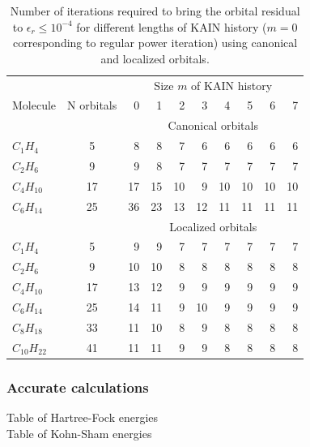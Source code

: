 \documentclass[mathserif]{beamer}
\begin{document}
\begin{frame}
\begin{table}
\scriptsize
\centering
\caption{\scriptsize{Number of iterations required to bring the orbital residual to 
	$\epsilon_r\leq10^{-4}$ for different lengths of KAIN history ($m=0$ corresponding
	to regular power iteration) using canonical and localized orbitals.}}
\begin{tabular}{lcrrrrrrrr}
\hline
\hline
	    &		&\multicolumn{8}{c}{Size $m$ of KAIN history}\\
Molecule    & N orbitals&  0	&  1    &  2    &  3    &  4    &  5    &  6    &  7    \\
\hline
&&\multicolumn{8}{c}{Canonical orbitals}\\
$C_{ 1}H_{ 4}$	&  5    &  8    &  8    &  7    &  6    &  6    &  6    &  6    &  6    \\ 
$C_{ 2}H_{ 6}$	&  9    &  9    &  8    &  7    &  7    &  7    &  7    &  7    &  7    \\ 
$C_{ 4}H_{10}$	& 17    & 17    & 15    & 10    &  9    & 10    & 10    & 10    & 10    \\
$C_{ 6}H_{14}$	& 25	& 36    & 23    & 13    & 12    & 11    & 11    & 11    & 11    \\
&&\multicolumn{8}{c}{Localized orbitals}\\
$C_{ 1}H_{ 4}$	&  5	&  9    &  9    &  7    &  7    &  7    &  7    &  7    &  7    \\ 
$C_{ 2}H_{ 6}$	&  9	& 10    & 10    &  8    &  8    &  8    &  8    &  8    &  8    \\ 
$C_{ 4}H_{10}$	& 17	& 13    & 12    &  9    &  9    &  9    &  9    &  9    &  9    \\
$C_{ 6}H_{14}$	& 25	& 14    & 11    &  9    & 10    &  9    &  9    &  9    &  9    \\
$C_{ 8}H_{18}$	& 33	& 11    & 10    &  8    &  9    &  8    &  8    &  8    &  8    \\
$C_{10}H_{22}$	& 41	& 11    & 11    &  9    &  9    &  8    &  8    &  8    &  8    \\
\hline
\hline
\end{tabular}
\end{table}
\end{frame}

\begin{frame}
    \frametitle{Accurate calculations}
    Table of Hartree-Fock energies\\
    Table of Kohn-Sham energies
\end{frame}
\end{document}
